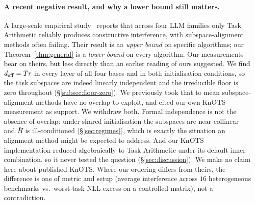 \paragraph{A recent negative result, and why a lower bound still
matters.} A large-scale empirical study~\citep{systematic2025merging}
reports that across four LLM families only Task Arithmetic reliably
produces constructive interference, with subspace-alignment methods
often failing. Their result is an \emph{upper bound} on specific
algorithms; our Theorem~\ref{thm:general} is a \emph{lower bound} on
every algorithm. Our measurements bear on theirs, but less directly than
an earlier reading of ours suggested. We find $d_{\mathrm{eff}} = Tr$ in every
layer of all four bases and in both initialisation conditions, so the
task subspaces are indeed linearly independent and the irreducible floor
is zero throughout (\S\ref{subsec:floor-zero}). We previously took that
to mean subspace-alignment methods have no overlap to exploit, and cited
our own KnOTS measurement as support. We withdraw both. Formal
independence is not the absence of overlap: under shared initialisation
the subspaces are near-collinear and $\bar H$ is ill-conditioned
(\S\ref{sec:regimes}), which is exactly the situation an alignment
method might be expected to address. And our KnOTS implementation
reduced algebraically to Task Arithmetic under its default inner
combination, so it never tested the question (\S\ref{sec:discussion}).
We make no claim here about published KnOTS. Where our ordering differs
from theirs, the
difference is one of metric and setup (average interference across
$16$ heterogeneous benchmarks vs.\ worst-task NLL excess on a
controlled matrix), not a contradiction.
